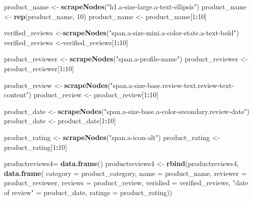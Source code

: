 \documentclass[
]{article}
\newenvironment{Shaded}{\begin{snugshade}}{\end{snugshade}}
\newcommand{\AttributeTok}[1]{\textcolor[rgb]{0.13,0.29,0.53}{#1}}
\newcommand{\DecValTok}[1]{\textcolor[rgb]{0.00,0.00,0.81}{#1}}
\newcommand{\FunctionTok}[1]{\textcolor[rgb]{0.13,0.29,0.53}{\textbf{#1}}}
\newcommand{\NormalTok}[1]{#1}
\newcommand{\OtherTok}[1]{\textcolor[rgb]{0.56,0.35,0.01}{#1}}
\newcommand{\SpecialCharTok}[1]{\textcolor[rgb]{0.81,0.36,0.00}{\textbf{#1}}}
\newcommand{\StringTok}[1]{\textcolor[rgb]{0.31,0.60,0.02}{#1}}
\begin{document}
\begin{Shaded}
\begin{Highlighting}[]
\NormalTok{  product\_name }\OtherTok{\textless{}{-}} \FunctionTok{scrapeNodes}\NormalTok{(}\StringTok{"h1.a{-}size{-}large.a{-}text{-}ellipsis"}\NormalTok{)}
\NormalTok{  product\_name }\OtherTok{\textless{}{-}} \FunctionTok{rep}\NormalTok{(product\_name, }\DecValTok{10}\NormalTok{)}
\NormalTok{  product\_name }\OtherTok{\textless{}{-}}\NormalTok{ product\_name[}\DecValTok{1}\SpecialCharTok{:}\DecValTok{10}\NormalTok{]}
  
\NormalTok{  verified\_reviews }\OtherTok{\textless{}{-}}\FunctionTok{scrapeNodes}\NormalTok{(}\StringTok{"span.a{-}size{-}mini.a{-}color{-}state.a{-}text{-}bold"}\NormalTok{)}
\NormalTok{  verified\_reviews }\OtherTok{\textless{}{-}}\NormalTok{verified\_reviews[}\DecValTok{1}\SpecialCharTok{:}\DecValTok{10}\NormalTok{]}
  
\NormalTok{  product\_reviewer }\OtherTok{\textless{}{-}} \FunctionTok{scrapeNodes}\NormalTok{(}\StringTok{"span.a{-}profile{-}name"}\NormalTok{)}
\NormalTok{  product\_reviewer }\OtherTok{\textless{}{-}}\NormalTok{ product\_reviewer[}\DecValTok{1}\SpecialCharTok{:}\DecValTok{10}\NormalTok{]}
  
\NormalTok{  product\_review }\OtherTok{\textless{}{-}} \FunctionTok{scrapeNodes}\NormalTok{(}\StringTok{"span.a{-}size{-}base.review{-}text.review{-}text{-}content"}\NormalTok{)}
\NormalTok{  product\_review }\OtherTok{\textless{}{-}}\NormalTok{ product\_review[}\DecValTok{1}\SpecialCharTok{:}\DecValTok{10}\NormalTok{]}
  
\NormalTok{  product\_date }\OtherTok{\textless{}{-}} \FunctionTok{scrapeNodes}\NormalTok{(}\StringTok{"span.a{-}size{-}base.a{-}color{-}secondary.review{-}date"}\NormalTok{)}
\NormalTok{  product\_date }\OtherTok{\textless{}{-}}\NormalTok{ product\_date[}\DecValTok{1}\SpecialCharTok{:}\DecValTok{10}\NormalTok{]}
  
\NormalTok{  product\_rating }\OtherTok{\textless{}{-}} \FunctionTok{scrapeNodes}\NormalTok{(}\StringTok{"span.a{-}icon{-}alt"}\NormalTok{)}
\NormalTok{  product\_rating }\OtherTok{\textless{}{-}}\NormalTok{ product\_rating[}\DecValTok{1}\SpecialCharTok{:}\DecValTok{10}\NormalTok{]}
  
\NormalTok{  productreviews4}\OtherTok{=} \FunctionTok{data.frame}\NormalTok{()}
\NormalTok{  productreviews4 }\OtherTok{\textless{}{-}} \FunctionTok{rbind}\NormalTok{(productreviews4, }\FunctionTok{data.frame}\NormalTok{(}
                      \AttributeTok{category =}\NormalTok{ product\_category,}
                      \AttributeTok{name =}\NormalTok{ product\_name,}
                      \AttributeTok{reviewer =}\NormalTok{ product\_reviewer,}
                      \AttributeTok{reviews =}\NormalTok{ product\_review,}
                      \AttributeTok{veridied =}\NormalTok{ verified\_reviews,}
                      \StringTok{"date of review"} \OtherTok{=}\NormalTok{ product\_date,}
                      \AttributeTok{ratings =}\NormalTok{ product\_rating))}


\end{Highlighting}
\end{Shaded}
\end{document}
